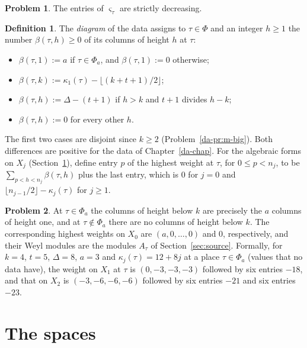 \documentclass[reqno]{amsart}
\newcounter{chap}
\theoremstyle{plain}
\theoremstyle{definition}
\newtheorem{problem}{Problem}[section]
\newtheorem{definition}[theorem]{Definition}
\begin{document}
\begin{problem}\label{pr:parameter}
The entries of \(\varsigma_\tau\) are strictly decreasing.
\end{problem}

\begin{definition}\label{def:diagram}
The \emph{diagram} of the data assigns to \(\tau \in \Phi\) and an integer \(h \ge 1\) the number \(\beta(\tau, h) \ge 0\) of its columns of height \(h\) at \(\tau\):
\begin{itemize}
\item \(\beta(\tau, 1) := a\) if \(\tau \in \Phi_a\), and \(\beta(\tau, 1) := 0\) otherwise;
\item \(\beta(\tau, k) := \kappa_1(\tau) - \lfloor (k + t + 1)/2 \rfloor\);
\item \(\beta(\tau, h) := \Delta - (t + 1)\) if \(h > k\) and \(t + 1\) divides \(h - k\);
\item \(\beta(\tau, h) := 0\) for every other \(h\).
\end{itemize}
\end{definition}

The first two cases are disjoint since \(k \ge 2\) (Problem~\ref{da-pr:m-big}).  Both differences are positive for the data of Chapter~\ref{da-chap}.  For the algebraic forms on \(X_j\) (Section~\ref{sec:spaces}), define entry \(p\) of the highest weight at \(\tau\), for \(0 \le p < n_j\), to be \(\sum_{p < h < n_j} \beta(\tau, h)\) plus the last entry, which is \(0\) for \(j = 0\) and \(\lfloor n_{j-1}/2 \rfloor - \kappa_j(\tau)\) for \(j \ge 1\).

\begin{problem}\label{pr:diagram}
At \(\tau \in \Phi_a\) the columns of height below \(k\) are precisely the \(a\) columns of height one, and at \(\tau \notin \Phi_a\) there are no columns of height below \(k\).  The corresponding highest weights on \(X_0\) are \((a, 0, \dots, 0)\) and \(0\), respectively, and their Weyl modules are the modules \(A_\tau\) of Section~\ref{sec:source}.  Formally, for \(k = 4\), \(t = 5\), \(\Delta = 8\), \(a = 3\) and \(\kappa_j(\tau) = 12 + 8j\) at a place \(\tau \in \Phi_a\) (values that no data have), the weight on \(X_1\) at \(\tau\) is \((0, -3, -3, -3)\) followed by six entries \(-18\), and that on \(X_2\) is \((-3, -6, -6, -6)\) followed by six entries \(-21\) and six entries \(-23\).
\end{problem}

\section{The spaces}\label{sec:spaces}
\end{document}
